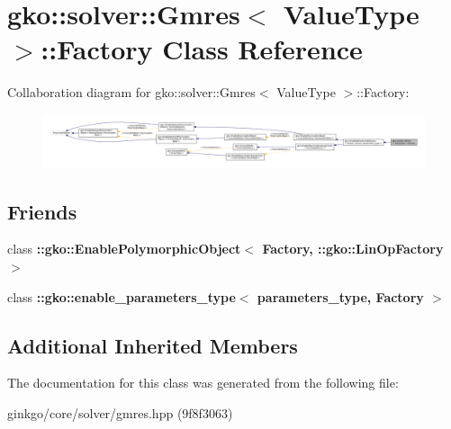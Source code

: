 \hypertarget{classgko_1_1solver_1_1Gmres_1_1Factory}{}\section{gko\+:\+:solver\+:\+:Gmres$<$ Value\+Type $>$\+:\+:Factory Class Reference}
\label{classgko_1_1solver_1_1Gmres_1_1Factory}


Collaboration diagram for gko\+:\+:solver\+:\+:Gmres$<$ Value\+Type $>$\+:\+:Factory\+:
\nopagebreak
\begin{figure}[H]
\begin{center}
\leavevmode
\includegraphics[width=350pt]{classgko_1_1solver_1_1Gmres_1_1Factory__coll__graph}
\end{center}
\end{figure}
\subsection*{Friends}
\begin{DoxyCompactItemize}
\item 
\mbox{\label{classgko_1_1solver_1_1Gmres_1_1Factory_a27e9bbc94a1c1c59f40833153eda8f78}} 
class {\bfseries \+::gko\+::\+Enable\+Polymorphic\+Object$<$ Factory, \+::gko\+::\+Lin\+Op\+Factory $>$}
\item 
\mbox{\label{classgko_1_1solver_1_1Gmres_1_1Factory_a0d176cbd42d6214e11aee8c30ca256fc}} 
class {\bfseries \+::gko\+::enable\+\_\+parameters\+\_\+type$<$ parameters\+\_\+type, Factory $>$}
\end{DoxyCompactItemize}
\subsection*{Additional Inherited Members}


The documentation for this class was generated from the following file\+:\begin{DoxyCompactItemize}
\item 
ginkgo/core/solver/gmres.\+hpp (9f8f3063)\end{DoxyCompactItemize}
